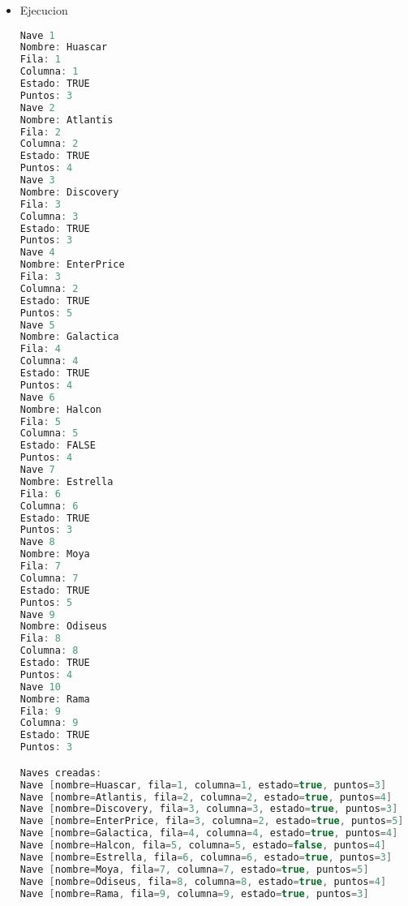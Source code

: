 \documentclass{article}
\begin{document}
\begin{itemize}
\begin{lstlisting}[language=java]
    // METODOS MUTADORES
    public void setNombre(String n) {
        nombre = n;
    }

    public void setFila(int f) {
        fila = f;
    }

    public void setColumna(String c) {
        columna = c;
    }

    public void setEstado(boolean e) {
        estado = e;
    }

    public void setPuntos(int p) {
        puntos = p;
    }

    // METODOS ACCESORES
    public String getNombre() {
        return nombre;
    }

    public int getFila() {
        return fila;
    }

    public String getColumna() {
        return columna;
    }

    public boolean getEstado() {
        return estado;
    }

    public int getPuntos() {
        return puntos;
    }

    public String toString() {
        return "Nave [nombre=" + nombre + ", fila=" + fila + ", columna=" + columna + ", estado=" + estado + ", puntos=" + puntos + "]";
    }
}
         \end{lstlisting}

         \item Ejecucion
        \begin{lstlisting}[language=java]
Nave 1
Nombre: Huascar
Fila: 1
Columna: 1
Estado: TRUE
Puntos: 3
Nave 2
Nombre: Atlantis
Fila: 2
Columna: 2
Estado: TRUE
Puntos: 4
Nave 3
Nombre: Discovery
Fila: 3
Columna: 3
Estado: TRUE
Puntos: 3
Nave 4
Nombre: EnterPrice
Fila: 3
Columna: 2
Estado: TRUE
Puntos: 5
Nave 5
Nombre: Galactica
Fila: 4
Columna: 4
Estado: TRUE
Puntos: 4
Nave 6
Nombre: Halcon
Fila: 5
Columna: 5
Estado: FALSE
Puntos: 4
Nave 7
Nombre: Estrella
Fila: 6
Columna: 6
Estado: TRUE
Puntos: 3
Nave 8
Nombre: Moya
Fila: 7
Columna: 7
Estado: TRUE
Puntos: 5
Nave 9
Nombre: Odiseus
Fila: 8
Columna: 8
Estado: TRUE
Puntos: 4
Nave 10
Nombre: Rama
Fila: 9
Columna: 9
Estado: TRUE
Puntos: 3

Naves creadas:
Nave [nombre=Huascar, fila=1, columna=1, estado=true, puntos=3]
Nave [nombre=Atlantis, fila=2, columna=2, estado=true, puntos=4]
Nave [nombre=Discovery, fila=3, columna=3, estado=true, puntos=3]
Nave [nombre=EnterPrice, fila=3, columna=2, estado=true, puntos=5]
Nave [nombre=Galactica, fila=4, columna=4, estado=true, puntos=4]
Nave [nombre=Halcon, fila=5, columna=5, estado=false, puntos=4]
Nave [nombre=Estrella, fila=6, columna=6, estado=true, puntos=3]
Nave [nombre=Moya, fila=7, columna=7, estado=true, puntos=5]
Nave [nombre=Odiseus, fila=8, columna=8, estado=true, puntos=4]
Nave [nombre=Rama, fila=9, columna=9, estado=true, puntos=3]


\end{lstlisting}
\end{itemize}
\end{document}
